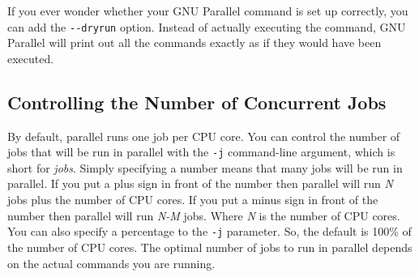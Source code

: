 \documentclass[
]{book}
\newenvironment{Shaded}{\begin{snugshade}}{\end{snugshade}}
\newcommand{\ExtensionTok}[1]{#1}
\newcommand{\FunctionTok}[1]{\textcolor[rgb]{0.00,0.00,0.00}{#1}}
\newcommand{\KeywordTok}[1]{\textcolor[rgb]{0.13,0.29,0.53}{\textbf{#1}}}
\newcommand{\NormalTok}[1]{#1}
\newcommand{\StringTok}[1]{\textcolor[rgb]{0.31,0.60,0.02}{#1}}
\theoremstyle{definition}
\theoremstyle{definition}
\theoremstyle{definition}
\theoremstyle{remark}
\begin{document}
\begin{rmdtip}
If you ever wonder whether your GNU Parallel command is set up correctly, you can add the \texttt{-\/-dryrun} option. Instead of actually executing the command, GNU Parallel will print out all the commands exactly as if they would have been executed.
\end{rmdtip}

\hypertarget{controlling-the-number-of-concurrent-jobs}{%
\subsection{Controlling the Number of Concurrent Jobs}\label{controlling-the-number-of-concurrent-jobs}}

By default, parallel runs one job per CPU core. You can control the number of jobs that will be run in parallel with the \texttt{-j} command-line argument, which is short for \emph{jobs}. Simply specifying a number means that many jobs will be run in parallel. If you put a plus sign in front of the number then parallel will run \emph{N} jobs plus the number of CPU cores. If you put a minus sign in front of the number then parallel will run \emph{N-M} jobs. Where \emph{N} is the number of CPU cores. You can also specify a percentage to the \texttt{-j} parameter. So, the default is 100\% of the number of CPU cores. The optimal number of jobs to run in parallel depends on the actual commands you are running.

\begin{Shaded}
\end{Shaded}

\begin{Shaded}
\end{Shaded}
\end{document}
